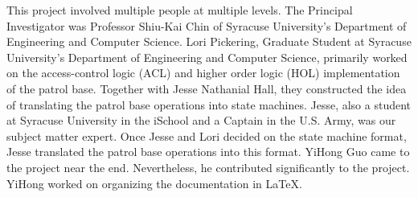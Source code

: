   This project involved multiple people at multiple levels. The Principal Investigator was
  Professor Shiu-Kai Chin of Syracuse University’s Department of Engineering and Computer Science.
  Lori Pickering, Graduate Student at Syracuse University’s Department of Engineering and Computer
  Science, primarily worked on the access-control logic (ACL) and higher order logic (HOL)
  implementation of the patrol base. Together with Jesse Nathanial Hall, they constructed the
  idea of translating the patrol base operations into state machines. Jesse, also a student at
  Syracuse University in the iSchool and a Captain in the U.S. Army, was our subject matter expert.
  Once Jesse and Lori decided on the state machine format, Jesse translated the patrol base operations
  into this format. YiHong Guo came to the project near the end. Nevertheless, he contributed significantly
  to the project. YiHong worked on organizing the documentation in LaTeX.

